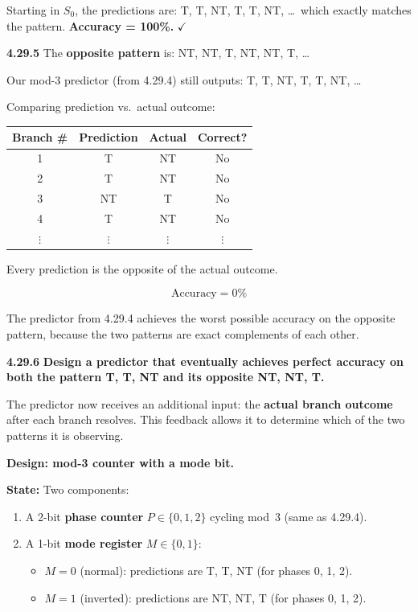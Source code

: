 Starting in $S_0$, the predictions are: T, T, NT, T, T, NT, \ldots\ which
exactly matches the pattern. \textbf{Accuracy = 100\%.} $\checkmark$

\medskip\noindent\textbf{4.29.5}
The \textbf{opposite pattern} is: NT, NT, T, NT, NT, T, \ldots

Our mod-3 predictor (from 4.29.4) still outputs: T, T, NT, T, T, NT, \ldots

Comparing prediction vs.\ actual outcome:

\begin{center}
\begin{tabular}{cccc}
\toprule
\textbf{Branch \#} & \textbf{Prediction} & \textbf{Actual} &
  \textbf{Correct?} \\
\midrule
1 & T  & NT & No \\
2 & T  & NT & No \\
3 & NT & T  & No \\
4 & T  & NT & No \\
$\vdots$ & $\vdots$ & $\vdots$ & $\vdots$ \\
\bottomrule
\end{tabular}
\end{center}

Every prediction is the opposite of the actual outcome.

\[
  \text{Accuracy} = \boxed{0\%}
\]

The predictor from 4.29.4 achieves the worst possible accuracy on the opposite
pattern, because the two patterns are exact complements of each other.

\medskip\noindent\textbf{4.29.6}
\textbf{Design a predictor that eventually achieves perfect accuracy on both
the pattern T, T, NT and its opposite NT, NT, T.}

The predictor now receives an additional input: the \textbf{actual branch
outcome} after each branch resolves. This feedback allows it to determine which
of the two patterns it is observing.

\textbf{Design: mod-3 counter with a mode bit.}

\textbf{State:} Two components:
\begin{enumerate}
  \item A 2-bit \textbf{phase counter} $P \in \{0, 1, 2\}$ cycling mod~3
    (same as 4.29.4).
  \item A 1-bit \textbf{mode register} $M \in \{0, 1\}$:
    \begin{itemize}
      \item $M = 0$ (normal): predictions are T, T, NT (for phases 0, 1, 2).
      \item $M = 1$ (inverted): predictions are NT, NT, T (for phases 0, 1, 2).
    \end{itemize}
\end{enumerate}


